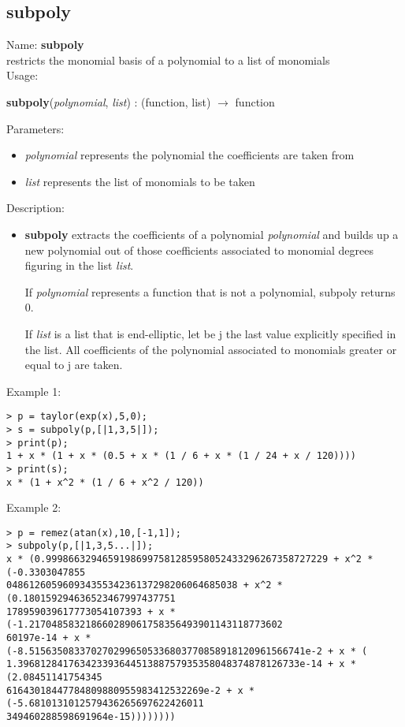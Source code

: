 \subsection{subpoly}
\label{labsubpoly}
\noindent Name: \textbf{subpoly}\\
restricts the monomial basis of a polynomial to a list of monomials\\
\noindent Usage: 
\begin{center}
\textbf{subpoly}(\emph{polynomial}, \emph{list}) : (\textsf{function}, \textsf{list}) $\rightarrow$ \textsf{function}
\end{center}
Parameters: 
\begin{itemize}
\item \emph{polynomial} represents the polynomial the coefficients are taken from
\item \emph{list} represents the list of monomials to be taken
\end{itemize}
\noindent Description: \begin{itemize}

\item \textbf{subpoly} extracts the coefficients of a polynomial \emph{polynomial} and builds up a
   new polynomial out of those coefficients associated to monomial degrees figuring in
   the list \emph{list}. 
    
   If \emph{polynomial} represents a function that is not a polynomial, subpoly returns 0.
    
   If \emph{list} is a list that is end-elliptic, let be j the last value explicitly specified
   in the list. All coefficients of the polynomial associated to monomials greater or
   equal to j are taken.
\end{itemize}
\noindent Example 1: 
\begin{center}\begin{minipage}{15cm}\begin{Verbatim}[frame=single]
> p = taylor(exp(x),5,0);
> s = subpoly(p,[|1,3,5|]);
> print(p);
1 + x * (1 + x * (0.5 + x * (1 / 6 + x * (1 / 24 + x / 120))))
> print(s);
x * (1 + x^2 * (1 / 6 + x^2 / 120))
\end{Verbatim}
\end{minipage}\end{center}
\noindent Example 2: 
\begin{center}\begin{minipage}{15cm}\begin{Verbatim}[frame=single]
> p = remez(atan(x),10,[-1,1]);
> subpoly(p,[|1,3,5...|]);
x * (0.99986632946591986997581285958052433296267358727229 + x^2 * (-0.3303047855
04861260596093435534236137298206064685038 + x^2 * (0.180159294636523467997437751
178959039617773054107393 + x * (-1.217048583218660289061758356493901143118773602
60197e-14 + x * (-8.5156350833702702996505336803770858918120961566741e-2 + x * (
1.39681284176342339364451388757935358048374878126733e-14 + x * (2.08451141754345
61643018447784809880955983412532269e-2 + x * (-5.6810131012579436265697622426011
349460288598691964e-15))))))))
\end{Verbatim}
\end{minipage}\end{center}

